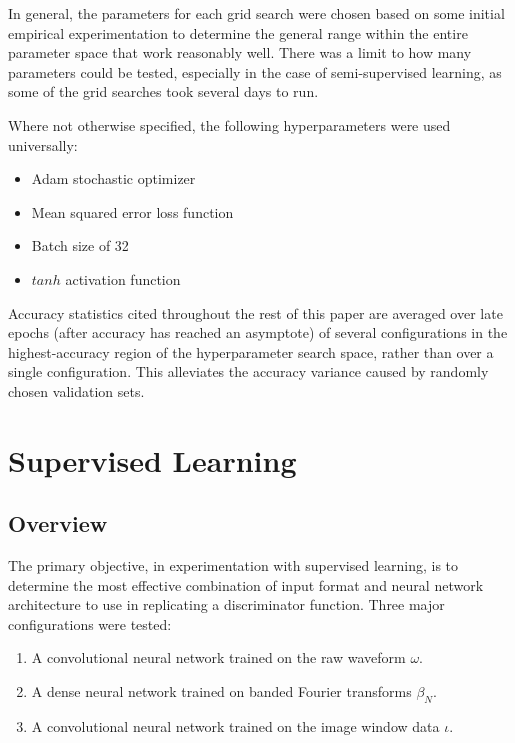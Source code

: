 \documentclass[10pt]{article}
\begin{document}
In general, the parameters for each grid search were chosen based on some initial empirical experimentation to determine the general range within the entire parameter space that work reasonably well. There was a limit to how many parameters could be tested, especially in the case of semi-supervised learning, as some of the grid searches took several days to run.

Where not otherwise specified, the following hyperparameters were used universally:
\begin{itemize}
    \item Adam \cite{adam} stochastic optimizer
    \item Mean squared error loss function
    \item Batch size of 32
    \item $tanh$ activation function
\end{itemize}

Accuracy statistics cited throughout the rest of this paper are averaged over late epochs (after accuracy has reached an asymptote) of several configurations in the highest-accuracy region of the hyperparameter search space, rather than over a single configuration. This alleviates the accuracy variance caused by randomly chosen validation sets.

\section{Supervised Learning}

\subsection{Overview}

The primary objective, in experimentation with supervised learning, is to determine the most effective combination of input format and neural network architecture to use in replicating a discriminator function. Three major configurations were tested:

\begin{enumerate}
    \item A convolutional neural network trained on the raw waveform $\omega$.
    \item A dense neural network trained on banded Fourier transforms $\beta_{N}$.
    \item A convolutional neural network trained on the image window data $\iota$.
\end{enumerate}
\end{document}
